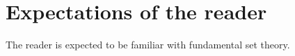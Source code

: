 

\section{Expectations of the reader}

The reader is expected to be familiar with fundamental set theory.


